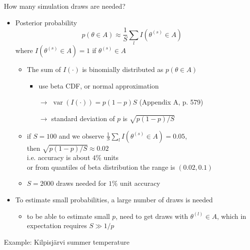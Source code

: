 \documentclass[english,t]{beamer}
\DeclareMathOperator{\var}{var}
\begin{document}
\begin{frame}{How many simulation draws are needed?}

  \begin{itemize}
  \item Posterior probability
    \begin{equation*}
      p(\theta \in A)\approx \frac{1}{S}\sum_l I(\theta^{(s)} \in A)
    \end{equation*}
    where $I(\theta^{(s)} \in A)=1$ if $\theta^{(s)} \in A$
    \begin{itemize}
    \item The sum of $I(\cdot)$ is binomially distributed as $p(\theta \in A)$
        \begin{itemize}
        \item use beta CDF, or normal approximation
        \item[$\rightarrow$] $\var(I(\cdot)) =  p(1-p)S$  (Appendix A, p. 579)
        \item[$\rightarrow$] standard deviation of $p$ is $\sqrt{p(1-p)/S}$
        \end{itemize}
        \pause
      \item if $S=100$ and we observe $\frac{1}{S}\sum_l I(\theta^{(s)} \in A)=0.05$,\\ then $\sqrt{p(1-p)/S} \approx 0.02$\\
        i.e. accuracy is about $4\%$ units\\
        or from quantiles of beta distribution the range is $(0.02,0.1)$
        \pause
      \item $S=2000$ draws needed for $1\%$ unit accuracy
    \end{itemize}
    \pause
  \item To  estimate small probabilities, a large number of draws is needed
    \begin{itemize}
    \item to be able to estimate small $p$, need to get draws with
      $\theta^{(l)} \in A$, which in expectation requires $S \gg 1/p$
    \end{itemize}
\end{itemize}

\end{frame}

\begin{frame}{Example: Kilpisjärvi summer temperature}

  \begin{center}
  \end{center}

\end{frame}
\end{document}
